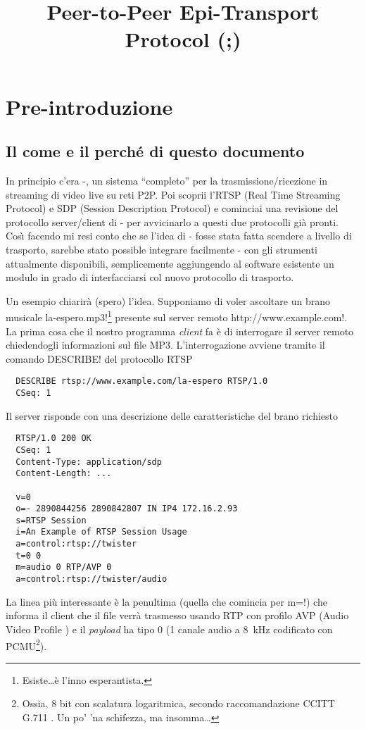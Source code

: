 \documentclass{rfc}
\title{Peer-to-Peer Epi-Transport Protocol (\ppmtp;)}
\author{
\fullname{Riccardo Bernardini}
\organization{University of Udine}
\address{street=Via delle Scienze, 208;city=Udine;code=33100;
country=IT}}
\begin{document}
  \maketitle
\tableofcontents

\chapter{Pre-introduzione}
\label{sect:6;transport_layer}

\section{Il come e il perch\'e di questo documento}
\label{sub:6.0;transport_layer}

In principio c'era \medusa-, un sistema ``completo'' per la
trasmissione/ricezione in streaming di video live su reti P2P.  Poi
scoprii l'RTSP (Real Time Streaming Protocol) e SDP (Session
Description Protocol) e cominciai una revisione del protocollo
server/client di \medusa- per avvicinarlo a questi due protocolli
gi\`a pronti.  Cos\`\i{} facendo mi resi conto che se l'idea di
\medusa- fosse stata fatta scendere a livello di trasporto, sarebbe
stato possible integrare facilmente \medusa-  con gli strumenti
attualmente disponibili, semplicemente aggiungendo al software
esistente un modulo in grado di interfacciarsi col nuovo protocollo di
trasporto.  

Un esempio chiarir\`a (spero) l'idea.  Supponiamo di voler ascoltare
un brano musicale \ttt la-espero.mp3!\footnote{Esiste\ldots \`e l'inno
esperantista.} presente sul server remoto \ttt
http://www.example.com!.  La prima cosa che il nostro programma
\emph{client} fa \`e di interrogare il server remoto chiedendogli
informazioni sul file MP3.  L'interrogazione avviene tramite il
comando \ttt DESCRIBE! del protocollo RTSP

\begin{verbatim}
  DESCRIBE rtsp://www.example.com/la-espero RTSP/1.0
  CSeq: 1
\end{verbatim}

Il server risponde con una descrizione delle caratteristiche del brano
richiesto

\begin{verbatim}
  RTSP/1.0 200 OK
  CSeq: 1
  Content-Type: application/sdp
  Content-Length: ...
  
  v=0
  o=- 2890844256 2890842807 IN IP4 172.16.2.93
  s=RTSP Session
  i=An Example of RTSP Session Usage
  a=control:rtsp://twister
  t=0 0
  m=audio 0 RTP/AVP 0
  a=control:rtsp://twister/audio
\end{verbatim}
%
La linea pi\`u interessante \`e la penultima (quella che comincia per
\ttt m=!) che informa il client che il file verr\`a trasmesso usando
RTP con profilo AVP (Audio Video Profile \cite{rfc3551}) e il
\emph{payload} ha tipo 0 (1 canale audio a 8~kHz codificato con
PCMU\footnote{Ossia, 8 bit con scalatura logaritmica, secondo
  raccomandazione CCITT G.711 \cite{rfc3551}. Un po' 'na schifezza, ma
insomma\ldots}). 
\end{document}
